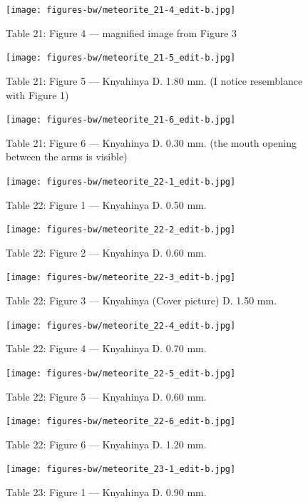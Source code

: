 \documentclass[a4paper, 12pt, oneside]{article}
\begin{document}
\clearpage
\begin{figure}[t]
\texttt{[image: figures-bw/meteorite\_21-4\_edit-b.jpg]}
\caption{Table 21: Figure 4 --- magnified image from Figure 3}
\centering
\end{figure}
\clearpage
\begin{figure}[t]
\texttt{[image: figures-bw/meteorite\_21-5\_edit-b.jpg]}
\caption{Table 21: Figure 5 --- Knyahinya D. 1.80 mm. (I notice resemblance with Figure 1)}
\centering
\end{figure}
\clearpage
\begin{figure}[t]
\texttt{[image: figures-bw/meteorite\_21-6\_edit-b.jpg]}
\caption{Table 21: Figure 6 --- Knyahinya D. 0.30 mm. (the mouth opening between the arms is visible)}
\centering
\end{figure}
\clearpage
{}
\begin{figure}[t]
\texttt{[image: figures-bw/meteorite\_22-1\_edit-b.jpg]}
\caption{Table 22: Figure 1 --- Knyahinya D. 0.50 mm.}
\centering
\end{figure}
\clearpage
\begin{figure}[t]
\texttt{[image: figures-bw/meteorite\_22-2\_edit-b.jpg]}
\caption{Table 22: Figure 2 --- Knyahinya D. 0.60 mm.}
\centering
\end{figure}
\clearpage
\begin{figure}[t]
\texttt{[image: figures-bw/meteorite\_22-3\_edit-b.jpg]}
\caption{Table 22: Figure 3 --- Knyahinya (Cover picture) D. 1.50 mm.}
\centering
\end{figure}
\clearpage
\begin{figure}[t]
\texttt{[image: figures-bw/meteorite\_22-4\_edit-b.jpg]}
\caption{Table 22: Figure 4 --- Knyahinya D. 0.70 mm.}
\centering
\end{figure}
\clearpage
\begin{figure}[t]
\texttt{[image: figures-bw/meteorite\_22-5\_edit-b.jpg]}
\caption{Table 22: Figure 5 --- Knyahinya D. 0.60 mm.}
\centering
\end{figure}
\clearpage
\begin{figure}[t]
\texttt{[image: figures-bw/meteorite\_22-6\_edit-b.jpg]}
\caption{Table 22: Figure 6 --- Knyahinya D. 1.20 mm.}
\centering
\end{figure}
\clearpage
{}
\begin{figure}[t]
\texttt{[image: figures-bw/meteorite\_23-1\_edit-b.jpg]}
\caption{Table 23: Figure 1 --- Knyahinya D. 0.90 mm.}
\centering
\end{figure}
\end{document}
